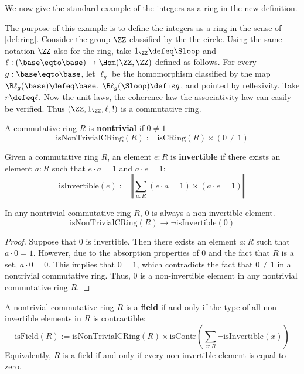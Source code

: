 We now give the standard example of the integers as a ring
in the new definition.

\begin{example}
The purpose of this example is to define the integers as a ring
in the sense of \cref{def:ring}.
Consider the group $\ZZ$ classified by the the circle.
Using the same notation $\ZZ$ also for the ring, take $1_\ZZ \defeq\Sloop$
and $\ell: (\base\eqto\base)\to\Hom(\ZZ,\ZZ)$ defined as follows.
For every $g:\base\eqto\base$, let $\ell_g$ be the homomorphism
classified by the map $\B\ell_g(\base)\defeq\base$, 
$\B\ell_g(\Sloop)\defis g$, and pointed by reflexivity.
Take $r\defeq\ell$. Now the unit laws, the coherence law
the associativity law can easily be verified. Thus
$(\ZZ,1_\ZZ,\ell,!)$ is a commutative ring.
\end{example}

\begin{definition}
A commutative ring $R$ is \textbf{nontrivial} if $0 \neq 1$
$$\mathrm{isNonTrivialCRing}(R) := \mathrm{isCRing}(R) \times (0 \neq 1)$$ 
\end{definition}

\begin{definition}
Given a commutative ring $R$, an element $e:R$ is \textbf{invertible} if there exists an element $a:R$ such that $e \cdot a = 1$ and $a \cdot e = 1$:
$$\mathrm{isInvertible}(e) := \left\Vert\sum_{a:R} (e \cdot a = 1) \times (a \cdot e = 1)\right\Vert$$
\end{definition}

\begin{theorem}
In any nontrivial commutative ring $R$, $0$ is always a non-invertible element. 
$$\mathrm{isNonTrivialCRing}(R) \to \neg \mathrm{isInvertible}(0)$$
\end{theorem}

\begin{proof}
Suppose that $0$ is invertible. Then there exists an element $a:R$ such that $a \cdot 0 = 1$. However, due to the absorption properties of $0$ and the fact that $R$ is a set, $a \cdot 0 = 0$. This implies that $0 = 1$, which contradicts the fact that $0 \neq 1$ in a nontrivial commutative ring. Thus, $0$ is a non-invertible element in any nontrivial commutative ring $R$. 
\end{proof}

\begin{definition}
A nontrivial commutative ring $R$ is a \textbf{field} if and only if the type of all non-invertible elements in $R$ is contractible:
$$\mathrm{isField}(R) := \mathrm{isNonTrivialCRing}(R) \times \mathrm{isContr}\left(\sum_{x:R} \neg \mathrm{isInvertible}(x)\right)$$ 
Equivalently, $R$ is a field if and only if every non-invertible element is equal to zero. 
\end{definition}

